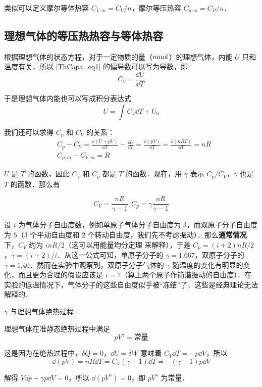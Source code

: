 类似可以定义摩尔等体热容 $C_{V,m}=C_V/n$，摩尔等压热容 $C_{p,m}=C_P/n$．

\subsection{理想气体的等压热热容与等体热容}

根据理想气体的状态方程，对于一定物质的量（$n \rm{mol}$）的理想气体，内能 $U$ 只和温度有关，所以 \autoref{ThCapa_eq1} 的偏导数可以写为导数，即
\begin{equation}
C_V=\frac{\dd U}{\dd T}
\end{equation}

于是理想气体内能也可以写成积分表达式
\begin{equation}
U=\int C_V\dd T + U_0
\end{equation}

我们还可以求得 $C_p$ 和 $C_V$ 的关系：
\begin{equation}
\begin{aligned}
&C_p-C_V=\frac{\dd (U+pV)}{\dd T}-\frac{\dd U}{\dd T}=\frac{\dd(pV)}{\dd T}=\frac{\dd (nRT)}{\dd T}=nR\\
&C_{p,m}-C_{V,m}=R
\end{aligned}
\end{equation}

$U$ 是 $T$ 的函数，因此 $C_V$ 和 $C_p$ 都是 $T$ 的函数．现在，用 $\gamma$ 表示 $C_p/C_V$，$\gamma$ 也是 $T$ 的函数．那么有

\begin{equation}\label{ThCapa_eq4}
C_V=\frac{nR}{\gamma-1},C_p=\gamma\frac{nR}{\gamma-1}
\end{equation}

设 $i$ 为气体分子自由度数，例如单原子气体分子自由度为 $3$，而双原子分子自由度为 $5$（$3$ 个平动自由度和 $2$ 个转动自由度，我们先不考虑振动）．那么\textbf{通常情况}下，$C_V$ 约为 $inR/2$（这可以用能量均分定理 来解释），于是 $C_p=(i+2)nR/2$，$\gamma=(i+2)/i$．从这一公式可知，单原子分子的 $\gamma=1.667$，双原子分子的 $\gamma=1.40$．然而在实验中观察到，双原子分子气体的 $\gamma$ 随温度的变化有明显的变化，而且更为合理的假设应该是 $i=7$（算上两个原子作简谐振动的自由度）．在实验的低温情况下，气体分子的这些自由度似乎被“冻结”了．这些是经典理论无法解释的．
\begin{example}{$\gamma$ 与理想气体绝热过程}

理想气体在准静态绝热过程中满足
\begin{equation}
pV^{\gamma}=\text{常量}
\end{equation}

这是因为在绝热过程中，$\delta{Q}=0$，$\dd{U}=\delta{W}$ 意味着 $C_V\dd{T}=-p\dd{V}$，所以
\begin{equation}
\dd(pV)=nR\dd{T}=C_V(\gamma-1)\dd{T}=-(\gamma-1)p\dd{V}
\end{equation}

解得 $V\dd{p}+\gamma p\dd{V} = 0$，所以 $\dd{(pV^\gamma)}=0$，即 $pV^{\gamma}$ 为常量．
\end{example}

